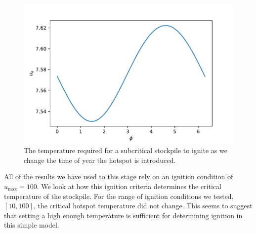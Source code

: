 \begin{figure}[h!]
\centering
\includegraphics[width=\linewidth]{figures/NDA/Hotspot/phi1.pdf}  
\caption{The temperature required for a subcritical stockpile to ignite as we change the time of year the hotspot is introduced.}
\label{fig:hot:phi}
\end{figure} 

All of the results we have used to this stage rely on an ignition condition of $u_{\text{max}}=100$. We look at how this ignition criteria determines the critical temperature of the stockpile. For the range of ignition conditions we tested, $[10,100]$, the critical hotspot temperature did not change. This seems to suggest that setting a high enough temperature is sufficient for determining ignition in this simple model.\\ 

